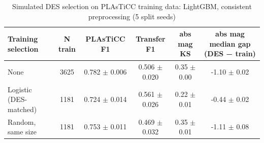 \begin{table}
\centering
\caption{Simulated DES selection on PLAsTiCC training data: LightGBM, consistent preprocessing (5 split seeds)}
\begin{tabular}{lccccc}
\hline
Training selection & N train & PLAsTiCC F1 & Transfer F1 & abs mag KS & abs mag median gap (DES − train) \\
\hline
None & 3625 & 0.782 $\pm$ 0.006 & 0.506 $\pm$ 0.020 & 0.35 $\pm$ 0.00 & -1.10 $\pm$ 0.02 \\
Logistic (DES-matched) & 1181 & 0.724 $\pm$ 0.014 & 0.561 $\pm$ 0.026 & 0.22 $\pm$ 0.01 & -0.44 $\pm$ 0.02 \\
Random, same size & 1181 & 0.753 $\pm$ 0.011 & 0.469 $\pm$ 0.032 & 0.35 $\pm$ 0.01 & -1.11 $\pm$ 0.08 \\
\hline
\end{tabular}
\end{table}
